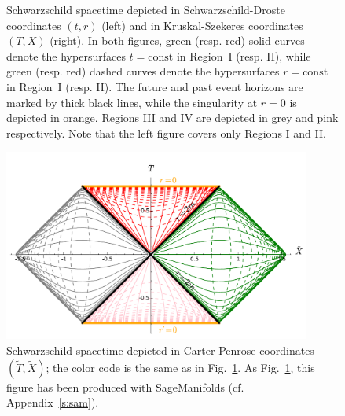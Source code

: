\begin{figure}
\caption[]{\label{f:sch:kruskal_diag} \footnotesize
Schwarzschild spacetime depicted in Schwarzschild-Droste coordinates $(t,r)$
(left) and in Kruskal-Szekeres coordinates $(T,X)$ (right). In both figures,
green (resp. red) solid curves denote the hypersurfaces $t=\mathrm{const}$
in Region~I (resp. II), while green (resp. red) dashed curves
denote the hypersurfaces $r=\mathrm{const}$ in Region~I (resp. II).
The future and past event horizons are marked by thick black lines, while the
singularity at $r=0$ is depicted in orange. Regions III and IV are depicted
in grey and pink respectively. Note that the left figure covers only Regions I and II.}
\end{figure}

\begin{figure}
\centerline{\includegraphics[width=0.9\textwidth]{sch_carter-penrose.pdf}}
\caption[]{\label{f:sch:sch_carter-penrose} \footnotesize
Schwarzschild spacetime depicted in Carter-Penrose coordinates $(\tilde{T},\tilde{X})$; the color code
is the same as in Fig.~\ref{f:sch:kruskal_diag}.
As Fig.~\ref{f:sch:kruskal_diag}, this figure has been produced with
SageManifolds (cf. Appendix~\ref{s:sam}).}
\end{figure}

